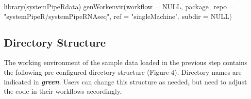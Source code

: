 \documentclass[14pt,]{article}
\newcommand{\hlstr}[1]{\textcolor[rgb]{0.251,0.627,0.251}{#1}}%
\newcommand{\hlstd}[1]{\textcolor[rgb]{0.251,0.251,0.251}{#1}}%
\newcommand{\hlkwc}[1]{\textcolor[rgb]{0.251,0.251,0.251}{#1}}%
\newcommand{\hlkwd}[1]{\textcolor[rgb]{0.878,0.439,0.125}{#1}}%
\newenvironment{Shaded}{\begin{myshaded}}{\end{myshaded}}
\newcommand{\KeywordTok}[1]{\hlkwd{#1}}
\newcommand{\DataTypeTok}[1]{\hlkwc{#1}}
\newcommand{\StringTok}[1]{\hlstr{#1}}
\newcommand{\OtherTok}[1]{{#1}}
\newcommand{\NormalTok}[1]{\hlstd{#1}}
\begin{document}
\begin{Shaded}
\begin{Highlighting}[]
\KeywordTok{library}\NormalTok{(systemPipeRdata)}
\KeywordTok{genWorkenvir}\NormalTok{(}\DataTypeTok{workflow =} \OtherTok{NULL}\NormalTok{, }\DataTypeTok{package_repo =} \StringTok{"systemPipeR/systemPipeRNAseq"}\NormalTok{, }\DataTypeTok{ref =} \StringTok{"singleMachine"}\NormalTok{, }
    \DataTypeTok{subdir =} \OtherTok{NULL}\NormalTok{)}
\end{Highlighting}
\end{Shaded}

\hypertarget{directory-structure}{%
\subsection{Directory Structure}\label{directory-structure}}

The working environment of the sample data loaded in the previous step contains
the following pre-configured directory structure (Figure 4). Directory names are indicated
in {\textbf{\emph{green}}}. Users can change this
structure as needed, but need to adjust the code in their workflows
accordingly.
\end{document}
